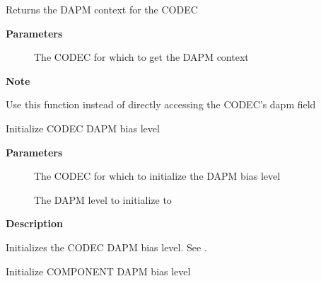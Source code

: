 \documentclass[a4paper,8pt,english]{sphinxmanual}
\begin{document}
\begin{fulllineitems}
\label{sound/kernel-api/alsa-driver-api:c.snd_soc_codec_get_dapm}
Returns the DAPM context for the CODEC

\end{fulllineitems}


\textbf{Parameters}
\begin{description}
\item[{}] \leavevmode
The CODEC for which to get the DAPM context

\end{description}

\textbf{Note}

Use this function instead of directly accessing the CODEC's dapm field

\begin{fulllineitems}
\label{sound/kernel-api/alsa-driver-api:c.snd_soc_codec_init_bias_level}
Initialize CODEC DAPM bias level

\end{fulllineitems}


\textbf{Parameters}
\begin{description}
\item[{}] \leavevmode
The CODEC for which to initialize the DAPM bias level

\item[{}] \leavevmode
The DAPM level to initialize to

\end{description}

\textbf{Description}

Initializes the CODEC DAPM bias level. See .

\begin{fulllineitems}
\label{sound/kernel-api/alsa-driver-api:c.snd_soc_component_init_bias_level}
Initialize COMPONENT DAPM bias level

\end{fulllineitems}
\end{document}
